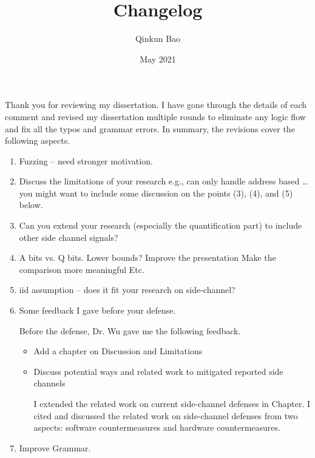 \documentclass{article}
\title{Changelog}
\author{Qinkun Bao}
\date{May 2021}
\begin{document}
\maketitle
Thank you for reviewing my dissertation. I have gone through the details of each comment and revised my dissertation multiple rounds to eliminate any logic flow and fix all the typos and grammar errors. In summary, the revisions cover the following aspects.


\begin{enumerate}
\item Fuzzing – need stronger motivation.
\item Discuss the limitations of your research
e.g., can only handle address based …
you might want to include some discussion on the points (3), (4), and (5) below.
\item Can you extend your research (especially the quantification part) to include other side channel signals?
\item A bits vs. Q bits. Lower bounds?
       Improve the presentation
       Make the comparison more meaningful
       Etc.
\item iid assumption – does it fit your research on side-channel?
\item Some feedback I gave before your defense.

Before the defense, Dr. Wu gave me the following feedback.
\begin{itemize}
\item Add a chapter on Discussion and Limitations
\item Discuss potential ways and related work to mitigated reported side channels

I extended the related work on current side-channel defenses in Chapter. I cited and discussed the related work on side-channel defenses from two aspects: software countermeasures and hardware countermeasures. 
\end{itemize}

\item Improve Grammar.
\end{enumerate}
\end{document}

